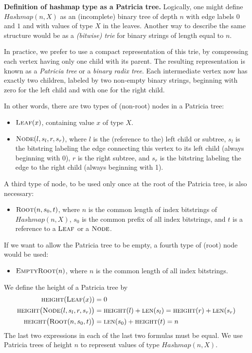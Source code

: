 \documentclass[12pt,oneside]{article}
\def\makepoint#1{\medbreak\noindent{\bf #1.\ }}
\def\nxsubpoint{\refstepcounter{subsubsection}%
  \smallbreak\makepoint{\thesubsubsection}}
\def\embt(#1.){\textbf{#1.}}
\let\tp=\textit
\def\opsc#1{\operatorname{\textsc{#1}}}
\def\height{\opsc{height}}
\def\len{\opsc{len}}
\def\leaf{\opsc{Leaf}}
\def\node{\opsc{Node}}
\def\root{\opsc{Root}}
\def\emptyroot{\opsc{EmptyRoot}}
\def\Hashmap{\tp{Hashmap}}
\begin{document}
\nxsubpoint\label{sp:patricia} \embt(Definition of hashmap type as a
Patricia tree.)  Logically, one might define $\Hashmap(n,X)$ as an
(incomplete) binary tree of depth $n$ with edge labels $0$ and $1$ and
with values of type $X$ in the leaves. Another way to describe the
same structure would be as a {\em (bitwise) trie\/} for binary strings
of length equal to $n$.

In practice, we prefer to use a compact representation of this trie,
by compressing each vertex having only one child with its parent. The
resulting representation is known as a {\em Patricia tree\/} or a {\em
  binary radix tree\/}. Each intermediate vertex now has exactly two
children, labeled by two non-empty binary strings, beginning with zero
for the left child and with one for the right child.

In other words, there are two types of (non-root) nodes in a Patricia
tree:
\begin{itemize}
\item $\leaf(x)$, containing value $x$ of type $X$.
\item $\node(l,s_l,r,s_r)$, where $l$ is the (reference to the) left
  child or subtree, $s_l$ is the bitstring labeling the edge
  connecting this vertex to its left child (always beginning with 0),
  $r$ is the right subtree, and $s_r$ is the bitstring labeling the
  edge to the right child (always beginning with 1).
\end{itemize}
A third type of node, to be used only once at the root of the Patricia
tree, is also necessary:
\begin{itemize}
\item $\root(n,s_0,t)$, where $n$ is the common length of index
  bitstrings of $\Hashmap(n,X)$, $s_0$ is the common prefix of all
  index bitstrings, and $t$ is a reference to a $\leaf$ or a $\node$.
\end{itemize}
If we want to allow the Patricia tree to be empty, a fourth type of
(root) node would be used:
\begin{itemize}
\item $\emptyroot(n)$, where $n$ is the common length of all index
  bitstrings.
\end{itemize}

We define the height of a Patricia tree by
\begin{align}
  \height(\leaf(x))&=0\\ \height\bigl(\node(l,s_l,r,s_r)\bigr)&=\height(l)+\len(s_l)=\height(r)+\len(s_r)\\ \height\bigl(\root(n,s_0,t)\bigr)&=\len(s_0)+\height(t)=n
\end{align}
The last two expressions in each of the last two formulas must be
equal. We use Patricia trees of height $n$ to represent values of type
$\Hashmap(n,X)$.
\end{document}

